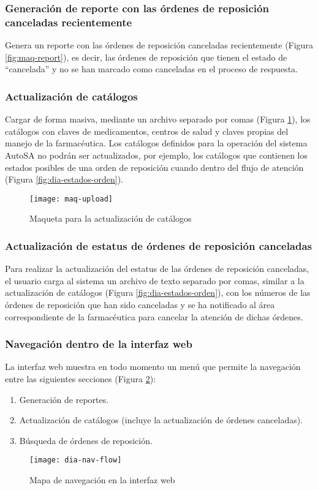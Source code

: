 \subsubsection{Generación de reporte con las órdenes de reposición canceladas recientemente}\label{sec:req-rep-canceladas}
Genera un reporte con las órdenes de reposición canceladas recientemente (Figura \ref{fig:maq-report}), es decir, las órdenes de reposición que tienen el estado de “cancelada” y no se han marcado como canceladas en el proceso de respuesta.

\subsubsection{Actualización de catálogos}\label{sec:req-catalogos}
Cargar de forma masiva, mediante un archivo separado por comas (Figura \ref{fig:maq-upload}), los catálogos con claves de medicamentos, centros de salud y claves propias del manejo de la farmacéutica. Los catálogos definidos para la operación del sistema AutoSA no podrán ser actualizados, por ejemplo, los catálogos que contienen los estados posibles de una orden de reposición cuando dentro del flujo de atención (Figura \ref{fig:dia-estados-orden}).
\begin{figure}[h]
  \centering
  \texttt{[image: maq-upload]}
  \caption{Maqueta para la actualización de catálogos}
  \label{fig:maq-upload}
\end{figure}

\subsubsection{Actualización de estatus de órdenes de reposición canceladas}\label{sec:req-canceladas}
Para realizar la actualización del estatus de las órdenes de reposición canceladas, el usuario carga al sistema un archivo de texto separado por comas, similar a la actualización de catálogos (Figura \ref{fig:dia-estados-orden}), con los números de las órdenes de reposición que han sido canceladas y se ha notificado al área correspondiente de la farmacéutica para cancelar la atención de dichas órdenes.

\subsubsection{Navegación dentro de la interfaz web}\label{sec:req-nav-bar}
La interfaz web muestra en todo momento un menú que permite la navegación entre las siguientes secciones (Figura \ref{fig:dia-nav-flow}):
\begin{enumerate}
  \item Generación de reportes.
  \item Actualización de catálogos (incluye la actualización de órdenes canceladas).
  \item Búsqueda de órdenes de reposición.
\end{enumerate}
\begin{figure}[h]
  \centering
  \texttt{[image: dia-nav-flow]}
  \caption{Mapa de navegación en la interfaz web}
  \label{fig:dia-nav-flow}
\end{figure}


